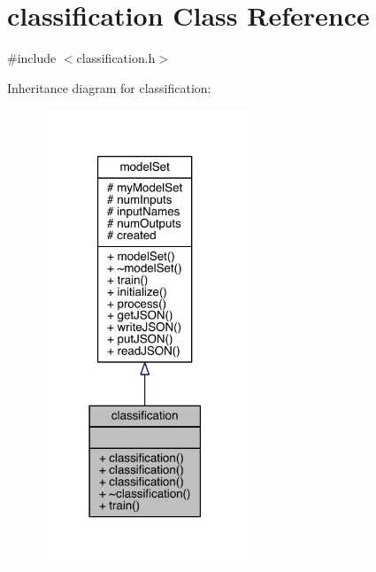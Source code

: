 \hypertarget{classclassification}{}\section{classification Class Reference}
\label{classclassification}


{\ttfamily \#include $<$classification.\+h$>$}



Inheritance diagram for classification\+:
\nopagebreak
\begin{figure}[H]
\begin{center}
\leavevmode
\includegraphics[width=174pt]{classclassification__inherit__graph}
\end{center}
\end{figure}


